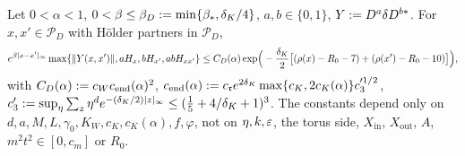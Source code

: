 \begin{proposition}\label{sup1:prop:S23}
Let $0<\alpha<1$, $0<\beta\le\beta_D:=\min\{\beta_*,\delta_K/4\}$, $a,b\in\{0,1\}$, $Y:= D^a\delta D^{b*}$. For $x,x'\in\mathcal P_D$ with H\"older partners in $\mathcal P_D$,
\[
e^{\beta|x-x'|_\infty}\max\{\lVert Y(x,x')\rVert,aH_x,bH_{x'},abH_{xx'}\}\le C_D(\alpha)\exp\!\Big(-\frac{\delta_K}2\big[(\rho(x)-R_0-7)+(\rho(x')-R_0-10)\big]\Big),
\]
with $C_D(\alpha):= c_Wc_{\mathrm{end}}(\alpha)^2$, $c_{\mathrm{end}}(\alpha):= c_{\mathfrak r}e^{2\delta_K}\max\{c_K,2c_K(\alpha)\}c_3'^{1/2}$, $c_3':=\sup_\eta\sum_z\eta^de^{-(\delta_K/2)|z|_\infty}\le(\frac15+4/\delta_K+1)^3$. The constants depend only on $d,a,M,L,\gamma_0,K_W,c_K,c_K(\alpha),f,\varphi$, not on $\eta,k,\varepsilon$, the torus side, $X_{\mathrm{in}}$, $X_{\mathrm{out}}$, $A$, $m^2t^2\in[0,c_m]$ or $R_0$.
\end{proposition}


